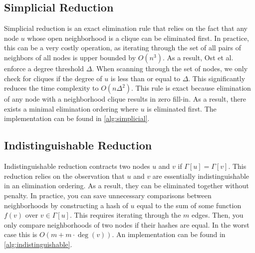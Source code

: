 \documentclass[final]{siamart250211}
\begin{document}
\subsection{Simplicial Reduction}
Simplicial reduction is an exact elimination rule that relies on the fact that any node $u$ whose open neighborhood is a clique can be eliminated first. In practice, this can be a very costly operation, as iterating through the set of all pairs of neighbors of all nodes is upper bounded by $O(n^3)$. As a result, Ost et al. enforce a degree threshold $\Delta$. When scanning through the set of nodes, we only check for cliques if the degree of $u$ is less than or equal to $\Delta$. This significantly reduces the time complexity to $O(n\Delta^2)$. This rule is exact because elimination of any node with a neighborhood clique results in zero fill-in. As a result, there exists a minimal elimination ordering where $u$ is eliminated first. The implementation can be found in \cref{alg:simplicial}.

\begin{algorithm}
\caption{Simplicial Reduction}
\label{alg:simplicial}
\begin{algorithmic}
\ENDIF
\ENDIF
\ENDFOR
\end{algorithmic}
\end{algorithm}

\subsection{Indistinguishable Reduction}
Indistinguishable reduction contracts two nodes $u$ and $v$ if $\Gamma[u] = \Gamma[v]$. This reduction relies on the observation that $u$ and $v$ are essentially indistinguishable in an elimination ordering. As a result, they can be eliminated together without penalty. In practice, you can save unnecessary comparisons between neighborhoods by constructing a hash of $u$ equal to the sum of some function $f(v)$ over $v\in \Gamma[u]$. This requires iterating through the $m$ edges. Then, you only compare neighborhoods of two nodes if their hashes are equal. In the worst case this is $O(m + m\cdot\deg(v))$. An implementation can be found in \cref{alg:indistinguishable}.

\begin{algorithm}
\caption{Indistinguishable Reduction}
\label{alg:indistinguishable}
\begin{algorithmic}
\ENDFOR

        \IF{$\Gamma[u] = \Gamma[v]$}
        \ENDIF
    \ENDIF
\ENDFOR
\end{algorithmic}
\end{algorithm}
\end{document}
